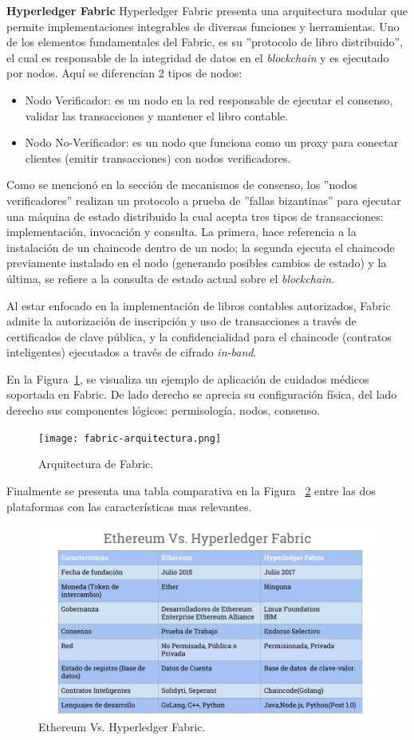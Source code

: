 \noindent
\textbf{Hyperledger Fabric} \newline
Hyperledger Fabric presenta una arquitectura modular que permite implementaciones integrables de diversas funciones y herramientas. Uno de los elementos fundamentales del Fabric, es su ''protocolo de libro distribuido'', el cual es responsable de la integridad de datos en el \textit{blockchain} y es ejecutado por nodos. Aquí se diferencian 2 tipos de nodos:
\begin{itemize}
    \item Nodo Verificador: es un nodo en la red responsable de ejecutar el consenso, validar las transacciones y mantener el libro contable.
    \item Nodo No-Verificador: es un nodo que funciona como un proxy para conectar clientes (emitir transacciones) con nodos verificadores.
\end{itemize}

Como se mencionó en la sección de mecanismos de consenso, los ''nodos verificadores'' realizan un protocolo a prueba de ''fallas bizantinas'' para ejecutar una máquina de estado distribuido la cual acepta tres tipos de transacciones: implementación, invocación y consulta. La primera, hace referencia a la instalación de un chaincode dentro de un nodo; la segunda ejecuta el chaincode previamente instalado en el nodo (generando posibles cambios de estado) y la última, se refiere a la consulta de estado actual sobre el \textit{blockchain}.

Al estar enfocado en la implementación de libros contables autorizados, Fabric admite la autorización de inscripción y uso de transacciones a través de certificados de clave pública, y la confidencialidad para el chaincode (contratos inteligentes) ejecutados a través de cifrado \textit{in-band}.

En la Figura~\ref{blockchain_fabric_arquitecture}, se visualiza un ejemplo de aplicación de cuidados médicos soportada en Fabric. De lado derecho se aprecia su configuración física, del lado derecho sus componentes lógicos: permisología, nodos, consenso.

\begin{figure}[H]
    \centering
    \texttt{[image: fabric-arquitectura.png]}
     \caption{Arquitectura de Fabric.} 
    \label{blockchain_fabric_arquitecture}
\end{figure}

Finalmente se presenta una tabla comparativa en la Figura ~\ref{blockchain_ethereum_hyperledger}  entre las dos plataformas con las características mas relevantes.

\begin{figure}[H]
    \centering
    \includegraphics[width=1\textwidth]{Figs/Chapter2/ethereum_vs_hyperledger.jpg}
     \caption{Ethereum Vs. Hyperledger Fabric.} 
    \label{blockchain_ethereum_hyperledger}
\end{figure}
